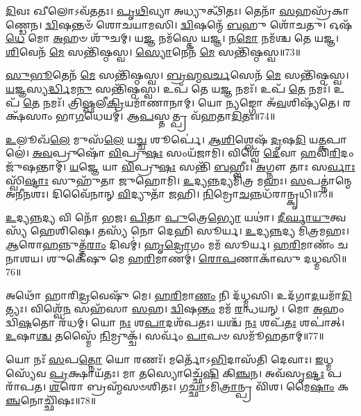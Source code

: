 \-\ul{𑌦𑌿}\-𑌵𑌃 𑌖𑍀𑌲𑍋\-𑌽𑌵᳴𑌤𑌤𑌃।
\-\ul{𑌪𑍃}\-\-\ul{𑌥𑌿}\-𑌵𑍍𑌯𑌾 𑌅𑌧𑍍𑌯𑍁𑌤𑍍𑌥𑌿᳴𑌤𑌃।
𑌤𑍇𑌨𑌾᳴ \ul{𑌸}\-𑌹𑌸𑍍𑌰᳴𑌕𑌾𑌣𑍍𑌡𑍇𑌨।
\-\ul{𑌦𑍍𑌵𑌿}\-𑌷𑌨𑍍𑌤𑍞᳴ 𑌶𑍋𑌚𑌯𑌾𑌮𑌸𑌿।
\-\ul{𑌦𑍍𑌵𑌿}\-𑌷𑌨𑍍𑌮𑍇᳴ \ul{𑌬}\-𑌹𑍁 𑌶𑍋᳴𑌚𑌤𑍁।
𑌓𑌷᳴\-\ul{𑌧𑍇} 𑌮𑍋 \ul{𑌅}\-𑌹𑍞 𑌶𑍁᳴𑌚𑌮𑍍।
𑌯\-\ul{𑌜𑍍𑌞} 𑌨𑌮᳴𑌸𑍍𑌤𑍇 𑌯𑌜𑍍𑌞।
𑌨\-\ul{𑌮𑍋} 𑌨𑌮᳴𑌶𑍍𑌚 𑌤𑍇 𑌯𑌜𑍍𑌞।
\-\ul{𑌶𑌿}\-𑌵𑍇𑌨᳴ \ul{𑌮𑍇} 𑌸𑌨𑍍𑌤𑌿᳴𑌷𑍍𑌠𑌸𑍍𑌵।
\-\ul{𑌸𑍍𑌯𑍋}\-𑌨𑍇𑌨᳴ \ul{𑌮𑍇} 𑌸𑌨𑍍𑌤𑌿᳴𑌷𑍍𑌠𑌸𑍍𑌵॥73॥

\-\ul{𑌸𑍁}\-\-\ul{𑌭𑍂}\-𑌤𑍇𑌨᳴ \ul{𑌮𑍇} 𑌸𑌨𑍍𑌤𑌿᳴𑌷𑍍𑌠𑌸𑍍𑌵।
\-\ul{𑌬𑍍𑌰}\-\-\ul{𑌹𑍍𑌮}\-\-\ul{𑌵}\-\-\ul{𑌰𑍍𑌚}\-𑌸𑍇𑌨᳴ \ul{𑌮𑍇} 𑌸𑌨𑍍𑌤𑌿᳴𑌷𑍍𑌠𑌸𑍍𑌵।
\-\ul{𑌯}\-𑌜𑍍𑌞𑌸𑍍𑌯\-\ul{𑌰𑍍𑌦𑍍𑌧𑌿}\-𑌮\-\ul{𑌨𑍁} 𑌸𑌨𑍍𑌤𑌿᳴𑌷𑍍𑌠𑌸𑍍𑌵।
𑌉𑌪᳴ 𑌤𑍇 𑌯\-\ul{𑌜𑍍𑌞} 𑌨𑌮𑌃᳴।
𑌉𑌪᳴ \ul{𑌤𑍇} 𑌨𑌮𑌃᳴।
𑌉𑌪᳴ \ul{𑌤𑍇} 𑌨𑌮𑌃᳴।
𑌤𑍍𑌰𑌿\-\ul{𑌷𑍍𑌫}\-𑌲𑍀\-\ul{𑌕𑍍𑌰𑌿}\-𑌯𑌮𑌾᳴𑌣𑌾𑌨𑌾𑌮𑍍।
𑌯𑍋 \ul{𑌨𑍍𑌯}\-𑌙𑍍𑌗𑍋 𑌅᳴\-\ul{𑌵}\-𑌶𑌿𑌷𑍍𑌯᳴𑌤𑍇।
𑌰𑌕𑍍𑌷᳴𑌸𑌾𑌂 𑌭𑌾\-\ul{𑌗}\-𑌧𑍇𑌯𑌮𑍍॑।
𑌆\-\ul{𑌪}\-𑌸𑍍𑌤𑌤𑍍𑌪𑍍𑌰 𑌵᳴𑌹𑌤𑌾\-\ul{𑌦𑌿}\-𑌤𑌃॥74॥

\-\ul{𑌉}\-𑌲𑍂𑌖᳴\-\ul{𑌲𑍇} 𑌮𑍁𑌸᳴\-\ul{𑌲𑍇} 𑌯\-\ul{𑌚𑍍𑌚} 𑌶𑍂𑌰𑍍𑌪𑍇॑।
\-\ul{𑌆}\-\-\ul{𑌶𑌿}\-𑌶𑍍𑌲𑍇𑌷᳴ \ul{𑌦𑍃}\-𑌷\-\ul{𑌦𑌿} 𑌯\-\ul{𑌤𑍍𑌕}\-𑌪𑌾𑌲𑍇॑।
\-\ul{𑌅}\-\-\ul{𑌵}\-𑌪𑍍𑌰𑍁𑌷𑍋᳴ \ul{𑌵𑌿}\-𑌪𑍍𑌰𑍁\-\ul{𑌷𑌃} 𑌸𑌂𑌯᳴𑌜𑌾𑌮𑌿।
𑌵𑌿𑌶𑍍𑌵𑍇᳴ \ul{𑌦𑍇}\-𑌵𑌾 \ul{𑌹}\-𑌵𑌿\-\ul{𑌰𑌿}\-𑌦𑌂 𑌜𑍁᳴𑌷𑌨𑍍𑌤𑌾𑌮𑍍।
\-\ul{𑌯}\-𑌜𑍍𑌞𑍇 𑌯𑌾 \ul{𑌵𑌿}\-𑌪𑍍𑌰𑍁\-\ul{𑌷𑌃} 𑌸𑌨𑍍𑌤𑌿᳴ \ul{𑌬}\-𑌹𑍍𑌵𑍀𑌃।
\-\ul{𑌅}\-𑌗𑍍𑌨𑍗 𑌤𑌾𑌃 𑌸\-\ul{𑌰𑍍𑌵𑌾𑌃} 𑌸𑍍𑌵𑌿᳴\-\ul{𑌷𑍍𑌟𑌾𑌃} 𑌸𑍁𑌹𑍁᳴𑌤𑌾 𑌜𑍁𑌹𑍋𑌮𑌿।
\-\ul{𑌉}\-𑌦𑍍𑌯\-\ul{𑌨𑍍𑌨}\-𑌦𑍍𑌯𑌮𑌿᳴𑌤𑍍𑌰 𑌮𑌹𑌃।
\-\ul{𑌸}\-𑌪𑌤𑍍𑌨𑌾॑𑌨𑍍𑌮𑍇 𑌅𑌨𑍀𑌨𑌶𑌃।
𑌦𑌿𑌵𑍈᳴𑌨𑌾𑌨𑍍 \ul{𑌵𑌿}\-𑌦𑍍𑌯𑍁𑌤𑌾᳴ 𑌜𑌹𑌿।
\-\ul{𑌨𑌿}\-𑌮𑍍𑌰𑍋\-\ul{𑌚}\-𑌨𑍍𑌨𑌧᳴𑌰𑌾𑌨𑍍𑌕𑍃𑌧𑌿॥75॥

\-\ul{𑌉}\-𑌦𑍍𑌯\-\ul{𑌨𑍍𑌨}\-𑌦𑍍𑌯 𑌵𑌿 𑌨𑍋᳴ 𑌭𑌜।
\-\ul{𑌪𑌿}\-𑌤𑌾 \ul{𑌪𑍁}\-𑌤𑍍𑌰𑍇\-\ul{𑌭𑍍𑌯𑍋} 𑌯𑌥𑌾॑।
\-\ul{𑌦𑍀}\-\-\ul{𑌰𑍍𑌘𑌾}\-\-\ul{𑌯𑍁}\-𑌤𑍍𑌵𑌸𑍍𑌯᳴ 𑌹𑍇𑌶𑌿𑌷𑍇।
𑌤𑌸𑍍𑌯᳴ 𑌨𑍋 𑌦𑍇𑌹𑌿 𑌸𑍂𑌰𑍍𑌯।
\-\ul{𑌉}\-𑌦𑍍𑌯\-\ul{𑌨𑍍𑌨}\-𑌦𑍍𑌯 𑌮𑌿᳴𑌤𑍍𑌰𑌮𑌹𑌃।
\-\ul{𑌆}\-𑌰𑍋\-\ul{𑌹}\-𑌨𑍍𑌨𑍁𑌤𑍍𑌤᳴\-\ul{𑌰𑌾𑌂} 𑌦𑌿𑌵𑌮𑍍॑।
\-\ul{𑌹𑍃}\-\-\ul{𑌦𑍍𑌰𑍋}\-𑌗𑌂 𑌮𑌮᳴ 𑌸𑍂𑌰𑍍𑌯।
\-\ul{𑌹}\-\-\ul{𑌰𑌿}\-𑌮𑌾𑌣𑌂᳴ 𑌚 𑌨𑌾𑌶𑌯।
𑌶𑍁𑌕𑍇᳴𑌷𑍁 𑌮𑍇 𑌹\-\ul{𑌰𑌿}\-𑌮𑌾𑌣𑌮𑍍॑।
\-\ul{𑌰𑍋}\-\-\ul{𑌪}\-𑌣𑌾𑌕𑌾᳴𑌸𑍁 𑌦𑌧𑍍𑌮𑌸𑌿॥76॥

𑌅𑌥𑍋᳴ 𑌹𑌾𑌰𑌿\-\ul{𑌦𑍍𑌰}\-𑌵𑍇𑌷𑍁᳴ 𑌮𑍇।
\-\ul{𑌹}\-\-\ul{𑌰𑌿}\-𑌮𑌾\-\ul{𑌣𑌂} 𑌨𑌿 𑌦᳴𑌧𑍍𑌮𑌸𑌿।
𑌉𑌦᳴𑌗𑌾\-\ul{𑌦}\-𑌯𑌮𑌾᳴\-\ul{𑌦𑌿}\-𑌤𑍍𑌯𑌃।
𑌵𑌿𑌶𑍍𑌵𑍇᳴\-\ul{𑌨} 𑌸𑌹᳴𑌸𑌾 \ul{𑌸}\-𑌹।
\-\ul{𑌦𑍍𑌵𑌿}\-𑌷\-\ul{𑌨𑍍𑌤𑌂} 𑌮𑌮᳴ \ul{𑌰}\-𑌨𑍍𑌧𑌯𑌨𑍍।
𑌮𑍋 \ul{𑌅}\-𑌹𑌂 𑌦𑍍𑌵𑌿᳴\-\ul{𑌷}\-𑌤𑍋 𑌰᳴𑌧𑌮𑍍।
𑌯𑍋 \ul{𑌨𑌃} 𑌶\-\ul{𑌪𑌾}\-𑌦𑌶᳴𑌪𑌤𑌃।
𑌯𑌶𑍍𑌚᳴ \ul{𑌨𑌃} 𑌶𑌪᳴\-\ul{𑌤𑌃} 𑌶𑌪𑌾॑𑌤𑍍।
\-\ul{𑌉}\-𑌷𑌾\-\ul{𑌶𑍍𑌚} 𑌤𑌸𑍍𑌮𑍈᳴ \ul{𑌨𑌿}\-𑌮𑍍𑌰𑍁𑌕𑍍𑌚᳴।
𑌸𑌰𑍍𑌵𑌂᳴ \ul{𑌪𑌾}\-𑌪𑍞 𑌸𑌮𑍂᳴𑌹𑌤𑌾𑌮𑍍॥77॥

𑌯𑍋 𑌨𑌃᳴ \ul{𑌸}\-𑌪\-\ul{𑌤𑍍𑌨𑍋} 𑌯𑍋 𑌰𑌣𑌃᳴।
𑌮𑌰𑍍𑌤𑍋᳴\-𑌽\-\ul{𑌭𑌿}\-𑌦𑌾𑌸᳴𑌤𑌿 𑌦𑍇𑌵𑌾𑌃।
\-\ul{𑌇}\-𑌧𑍍𑌮𑌸𑍍𑌯𑍇᳴𑌵 \ul{𑌪𑍍𑌰}\-𑌕𑍍𑌷𑌾𑌯᳴𑌤𑌃।
𑌮𑌾 𑌤𑌸𑍍𑌯𑍋𑌚𑍍𑌛𑍇᳴\-\ul{𑌷𑌿} 𑌕𑌿\-\ul{𑌞𑍍𑌚}\-𑌨।
𑌅𑌵᳴𑌸𑍃\-\ul{𑌷𑍍𑌟𑌃} 𑌪𑌰𑌾᳴𑌪𑌤।
\-\ul{𑌶}\-𑌰𑍋 𑌬𑍍𑌰𑌹𑍍𑌮᳴𑌸𑍞𑌶𑌿𑌤𑌃।
𑌗\-\ul{𑌚𑍍𑌛𑌾}\-\-𑌽𑌮𑌿\-\ul{𑌤𑍍𑌰𑌾}\-𑌨𑍍𑌪𑍍𑌰 𑌵𑌿᳴𑌶।
𑌮𑍈\-\ul{𑌷𑌾𑌂} 𑌕\-\ul{𑌞𑍍𑌚}\-𑌨𑍋𑌚𑍍𑌛𑌿᳴𑌷𑌃॥78॥

